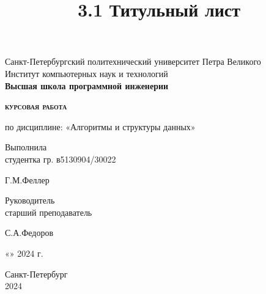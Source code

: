 \documentclass[a4paper,14pt]{article}
\title{3.1 Титульный лист}
\begin{document}
\thispagestyle{empty}    %

\begin{center}
    Санкт-Петербургский политехнический университет Петра Великого\\
    Институт компьютерных наук и технологий\\
    \bfseries{Высшая школа программной инженерии}
\end{center}

\vspace{20ex} %

\begin{center}
    \begin{huge} {\bfseries{\scshape курсовая работа}} \end{huge}

    \vspace{3ex}

    по дисциплине: «Алгоритмы и структуры данных»
\end{center}

\vspace{30ex}

\noindent Выполнила\\
студентка гр. в5130904/30022\hfill \begin{minipage}{0.6\textwidth} \hfill Г.М.Феллер\end{minipage}

\vspace{3ex}

\noindent Руководитель\\
старший преподаватель\hfill \begin{minipage} {0.6\textwidth}\hfill С.А.Федоров\end{minipage}

\vspace{3ex}

\hfill \begin{minipage}{0.6\textwidth} \hfill «\underline{\hspace{1cm}}»\underline{\hspace{3cm}} 2024 г.\end{minipage}

\vfill

\begin{center}
    Санкт-Петербург\\ 
    2024
\end{center}

\newpage %
\end{document}
